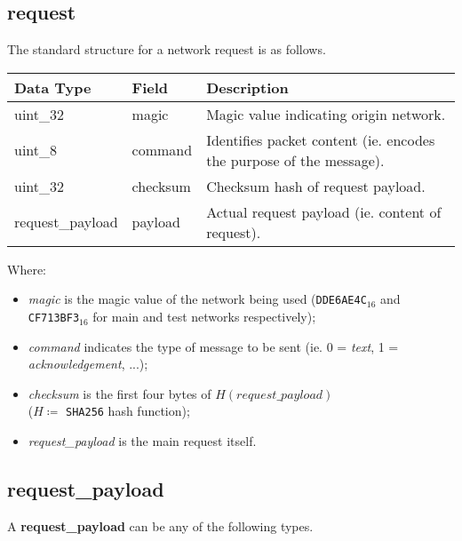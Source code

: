 \documentclass{article}
\begin{document}
\subsection{request}
The standard structure for a network request is as follows.
\begin{table}[H]
\centering
\begin{tabular}{|p{2.5cm}|p{2cm}|p{5.5cm}|}
\hline
\rowcolor{tblgrey} 
Data Type   & Field       & Description                                      \\ \hline
uint\_32    & magic       & Magic value indicating origin network.           \\ \hline
uint\_8     & command     & Identifies packet content (ie. encodes the purpose of the message). \\ \hline
uint\_32    & checksum    & Checksum hash of request payload.                \\ \hline
request\_payload & payload     & Actual request payload (ie. content of request). \\ \hline
\end{tabular}
\end{table}
Where:
\begin{itemize}
    \item \textit{magic} is the magic value of the network being used (\texttt{DDE6AE4C}$_{16}$ and \\ \texttt{CF713BF3}$_{16}$ for main and test networks respectively);
    \item \textit{command} indicates the type of message to be sent (ie. 0 = \textit{text}, 1 = \textit{acknowledgement}, ...);
    \item \textit{checksum} is the first four bytes of $H(request\_payload)$ \\
    ($H \coloneqq$ \texttt{SHA256} hash function);
    \item \textit{request\_payload} is the main request itself.
\end{itemize}

\newpage

\subsection{request\_payload}
A \textbf{request\_payload} can be any of the following types.
\end{document}
